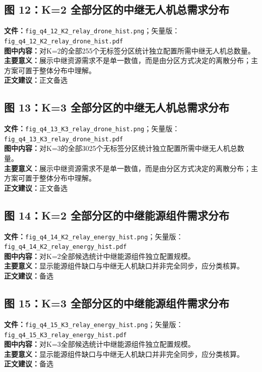 \subsection*{图 12：K=2 全部分区的中继无人机总需求分布}
\textbf{文件：}\texttt{fig\_q4\_12\_K2\_relay\_drone\_hist.png}；矢量版：\texttt{fig\_q4\_12\_K2\_relay\_drone\_hist.pdf}\\
\textbf{图中内容：}对K=2的全部255个无标签分区统计独立配置所需中继无人机总数量。\\
\textbf{主要意义：}展示中继资源需求不是单一数值，而是由分区方式决定的离散分布；主方案可置于整体分布中理解。\\
\textbf{正文建议：}正文备选

\subsection*{图 13：K=3 全部分区的中继无人机总需求分布}
\textbf{文件：}\texttt{fig\_q4\_13\_K3\_relay\_drone\_hist.png}；矢量版：\texttt{fig\_q4\_13\_K3\_relay\_drone\_hist.pdf}\\
\textbf{图中内容：}对K=3的全部3025个无标签分区统计独立配置所需中继无人机总数量。\\
\textbf{主要意义：}展示中继资源需求不是单一数值，而是由分区方式决定的离散分布；主方案可置于整体分布中理解。\\
\textbf{正文建议：}正文备选

\subsection*{图 14：K=2 全部分区的中继能源组件需求分布}
\textbf{文件：}\texttt{fig\_q4\_14\_K2\_relay\_energy\_hist.png}；矢量版：\texttt{fig\_q4\_14\_K2\_relay\_energy\_hist.pdf}\\
\textbf{图中内容：}对K=2全部候选统计中继能源组件独立配置规模。\\
\textbf{主要意义：}显示能源组件缺口与中继无人机缺口并非完全同步，应分类核算。\\
\textbf{正文建议：}备选

\subsection*{图 15：K=3 全部分区的中继能源组件需求分布}
\textbf{文件：}\texttt{fig\_q4\_15\_K3\_relay\_energy\_hist.png}；矢量版：\texttt{fig\_q4\_15\_K3\_relay\_energy\_hist.pdf}\\
\textbf{图中内容：}对K=3全部候选统计中继能源组件独立配置规模。\\
\textbf{主要意义：}显示能源组件缺口与中继无人机缺口并非完全同步，应分类核算。\\
\textbf{正文建议：}备选

